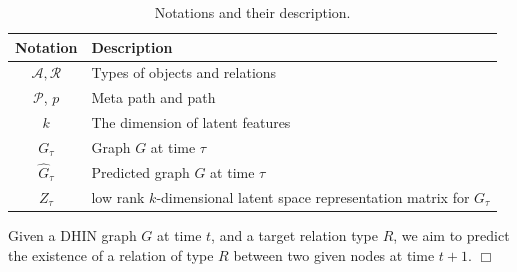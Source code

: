 \begin{table}[h]
\centering
\caption{Notations and their description.}
\scriptsize
\label{table_notations}
\begin{tabular}{|c|l|} \hline
\textbf{Notation} & \textbf{Description} \\ \hline

$\mathcal{A}, \mathcal{R}$  &  Types of objects and relations \\ \hline
$\mathcal{P}$, $p$  & Meta path and path \\ \hline
$k$ & The dimension of latent features \\ \hline
$G_\tau$ & Graph $G$ at time $\tau$  \\ \hline
$\hat{G}_\tau$ & Predicted graph $G$ at time $\tau$  \\ \hline
$Z_\tau$ & low rank $k$-dimensional latent space representation matrix for $G_\tau$ \\ \hline


\end{tabular}
\end{table}


\begin{definition}\label{problemdef}
Given a DHIN graph $G$ at time $t$, and a target relation type $R$, we aim to predict the existence of a relation of type $R$ between two given nodes at time $t+1$. $\Box$
 \end{definition}


